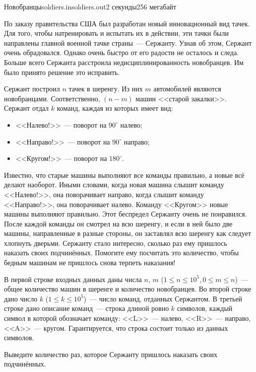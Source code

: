 \begin{problem}{Новобранцы}{soldiers.in}{soldiers.out}{2 секунды}{256 мегабайт}
                                                                    
По заказу правительства США был разработан новый инновационный вид тачек. Для того, чтобы натренировать и испытать их в действии, эти тачки были направлены
главной военной тачке страны~--- Сержанту. Узнав об этом, Сержант очень обрадовался. Однако очень быстро от его радости не осталось и следа. Больше всего Сержанта 
расстроила недисциплинированность новобранцев. Им было принято решение это исправить.

Сержант построил $n$ тачек в шеренгу. Из них $m$ автомобилей являются новобранцами. Соответственно, $(n - m)$ машин <<старой закалки>>.
Сержант отдал $k$ команд, каждая из которых имеет вид:
\begin{itemize}
    \item <<Налево!>>~--- поворот на $90^{\circ}$ налево;
    \item <<Направо!>>~--- поворот на $90^{\circ}$ направо;
    \item <<Кругом!>>~--- поворот на $180^{\circ}$.
\end{itemize} 
Известно, что старые машины выполняют все команды правильно, а новые всё делают наоборот. Иными словами, когда новая машина слышит команду <<Налево!>>, она поворачивает
направо, когда слышит команду <<Направо!>>, она поворачивает налево. Команду <<Кругом>> новые машины выполняют правильно. 
Этот беспредел Сержанту очень не понравился. После каждой команды он смотрел на всю шеренгу, и если в ней было две машины, направленные в разные стороны,
он заставлял всю шеренгу как следует хлопнуть дверьми.
Сержанту стало интересно, сколько раз ему пришлось наказать своих подчинённых. 
Помогите ему посчитать это количество, чтобы бедным машинам не пришлось снова терпеть наказания!

\InputFile
В первой строке входных данных даны числа $n$, $m$ ($1 \le n \le 10^5, 0 \le m \le n$)~--- общее количество машин в шеренге и количество новобранцев.
Во второй строке дано число $k$ ($1 \le k \le 10^5$)~--- число команд, отданных Сержантом.
В третьей строке дано описание команд~--- строка длиной ровно $k$ символов, каждый символ в которой обозначает команду: <<L>>~--- налево, <<R>>~--- направо, <<A>>~--- кругом.
Гарантируется, что строка состоит только из данных символов.

\OutputFile
Выведите количество раз, которое Сержанту пришлось наказать своих подчинённых.

\Example
\begin{example}%
%
\end{example}

\end{problem}
